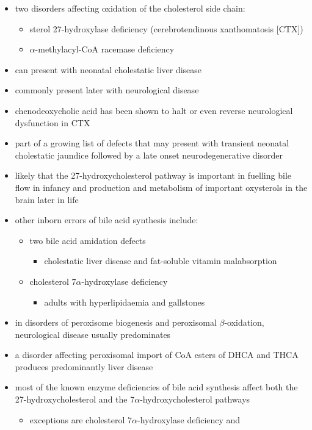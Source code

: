 \documentclass{scrartcl}
\begin{document}
\begin{itemize}
\item two disorders affecting oxidation of the cholesterol side chain:
\begin{itemize}
\item sterol 27-hydroxylase deficiency (cerebrotendinous xanthomatosis [CTX])
\item \(\alpha\)-methylacyl-CoA racemase deficiency
\end{itemize}
\item can present with neonatal cholestatic liver disease
\item commonly present later with neurological disease
\item chenodeoxycholic acid has been shown to halt or even reverse
neurological dysfunction in CTX
\item part of a growing list of defects that may present with transient
neonatal cholestatic jaundice followed by a late onset
neurodegenerative disorder
\item likely that the 27-hydroxycholesterol pathway is important in
fuelling bile flow in infancy and production and metabolism of
important oxysterols in the brain later in life
\item other inborn errors of bile acid synthesis include:
\begin{itemize}
\item two bile acid amidation defects
\begin{itemize}
\item cholestatic liver disease and fat-soluble vitamin malabsorption
\end{itemize}
\item cholesterol 7\(\alpha\)-hydroxylase deficiency
\begin{itemize}
\item adults with hyperlipidaemia and gallstones
\end{itemize}
\end{itemize}
\item in disorders of peroxisome biogenesis and peroxisomal
\(\beta\)-oxidation, neurological disease usually predominates
\item a disorder affecting peroxisomal import of CoA esters of DHCA and
THCA produces predominantly liver disease
\item most of the known enzyme deficiencies of bile acid synthesis affect
both the 27-hydroxycholesterol and the 7\(\alpha\)-hydroxycholesterol pathways
\begin{itemize}
\item exceptions are cholesterol 7\(\alpha\)-hydroxylase deficiency and

\end{itemize}
\end{itemize}
\end{document}
